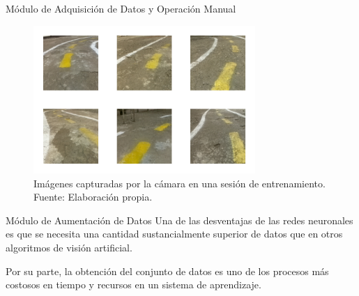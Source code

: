 \documentclass[10pt]{beamer}
\begin{document}
\begin{frame}{Módulo de Adquisición de Datos y Operación Manual}
    \begin{figure}[!h] 
        \centering
        \includegraphics[width=0.75\textwidth]{../img/fotosejemplo}
        \caption[Imágenes capturadas por la cámara en una sesión de entrenamiento]{Imágenes capturadas por la cámara en una sesión de entrenamiento. Fuente: Elaboración propia. }
    \end{figure}
    
\end{frame}

\begin{frame}{Módulo de Aumentación de Datos}
    Una de las desventajas de las redes neuronales es que se necesita una 
    cantidad sustancialmente superior de datos que en otros algoritmos de visión 
    artificial.

    Por su parte, la obtención del conjunto de datos es uno de los procesos más costosos en tiempo 
    y recursos en un sistema de aprendizaje.

\end{frame}
\end{document}
